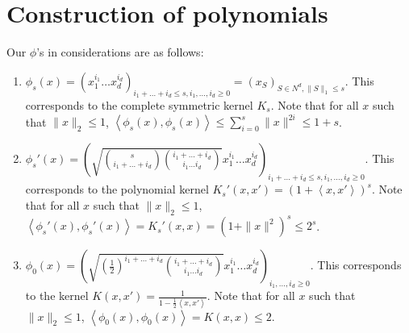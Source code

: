 \documentclass{article}
\newcommand{\inner}[1]{ \left\langle {#1} \right\rangle }
\begin{document}
\section{Construction of polynomials}
Our $\phi$'s in considerations are as follows:
\begin{enumerate}
\item $\phi_{s}(x) = ( x_1^{i_1} \ldots x_d^{i_d})_{i_1 + \ldots + i_d \leq s, i_1, \ldots, i_d \geq 0} = (x_S)_{S \in N^d, \|S\|_1 \leq s}$. This corresponds to the complete symmetric kernel $K_s$. Note that for all $x$ such that $\| x \|_2 \leq 1$,
$\inner{\phi_{s}(x), \phi_{s}(x)} \leq \sum_{i=0}^s \|x\|^{2i} \leq 1 + s$.

\item $\phi_{s}'(x) = ( \sqrt{ {s \choose i_1+\ldots+i_d} {i_1+\ldots+i_d \choose i_1 \ldots i_d}}  x_1^{i_1} \ldots x_d^{i_d})_{i_1 + \ldots + i_d \leq s, i_1, \ldots, i_d \geq 0}$. This corresponds to the polynomial kernel
$K_s'(x,x') = (1 + \inner{x, x'})^s$. Note that for all $x$ such that $\| x \|_2 \leq 1$,
$\inner{\phi_s'(x), \phi_s'(x)} = K_s'(x,x) = (1 + \|x\|^2)^s \leq 2^s$.

\item $\phi_0(x) = ( \sqrt{ (\frac 1 2)^{i_1+\ldots+i_d} {i_1+\ldots+i_d \choose i_1 \ldots i_d}}  x_1^{i_1} \ldots x_d^{i_d})_{i_1, \ldots, i_d \geq 0}$. This corresponds to the kernel $K(x,x') = \frac{1}{1 - \frac 1 2 \inner{x,x'}}$.
Note that for all $x$ such that $\| x \|_2 \leq 1$,
$\inner{\phi_0(x), \phi_0(x)} = K(x,x) \leq 2$.
\end{enumerate}
\end{document}

